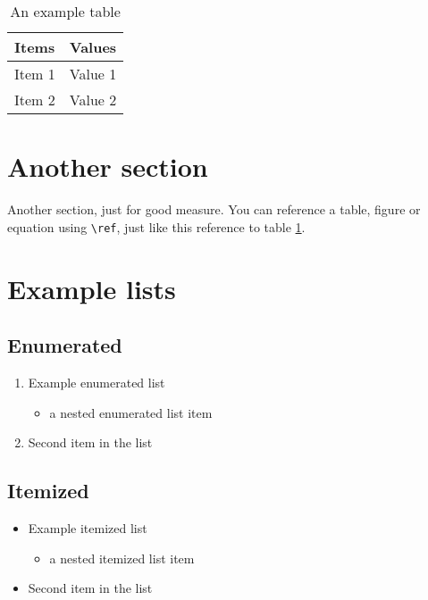 \documentclass[11pt,openright,twoside,a4paper]{report}
\begin{document}
\begin{table}[htb]
\begin{center}
\caption{An example table}
\label{Example-Table}
\begin{tabular}{|l|l|}
\hline
Items & Values \\
\hline
\hline
Item 1 & Value 1 \\
Item 2 & Value 2 \\
\hline
\end{tabular}
\end{center}
\end{table}

\section[short section title]{Another section}
Another section, just for good measure.
You can reference a table, figure or equation using \verb|\ref|, just
like this reference to table \ref{Example-Table}.

\section{Example lists}

\subsection{Enumerated}

\begin{enumerate}
\item Example enumerated list
  \begin{itemize}
  \item a nested enumerated list item
  \end{itemize}
\item Second item in the list
\end{enumerate}

\subsection{Itemized}

\begin{itemize}
\item Example itemized list
  \begin{itemize}
  \item a nested itemized list item
  \end{itemize}
\item Second item in the list
\end{itemize}
\end{document}
